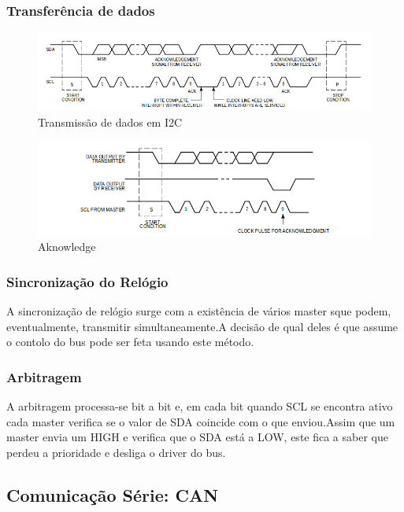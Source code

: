 \documentclass[10pt,a4paper]{paper}
\begin{document}
\subsubsection{Transferência de dados}

 	\begin{figure}[ht]
		\includegraphics[scale=0.5]{fig12.png}
		\centering
		\caption {Transmissão de dados em I2C}
		\label{fig:figura11}
	\end{figure}

 	\begin{figure}[ht]
		\includegraphics[scale=0.5] {fig13.png}
		\centering
		\caption {Aknowledge}
		\label{fig:figura11}
	\end{figure}

\subsubsection*{Sincronização do Relógio}

A sincronização de relógio surge com a existência de vários master sque podem, eventualmente, transmitir simultaneamente.A decisão de qual deles é que assume o contolo do bus pode ser feta usando este método.


\subsubsection*{Arbitragem}
A arbitragem processa-se bit a bit e, em cada bit quando SCL se encontra ativo cada master verifica se o valor de SDA coincide com o que enviou.Assim que um master envia um HIGH e verifica que o SDA está a LOW, este fica a saber que perdeu a prioridade e desliga o driver do bus.


\subsection*{Comunicação Série: CAN}
\end{document}
